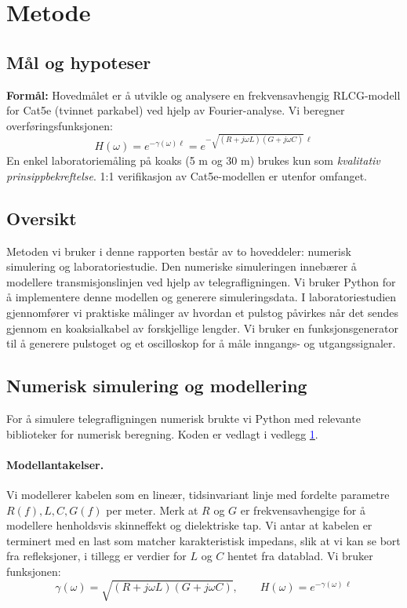 \section{Metode}

\subsection{Mål og hypoteser}
\textbf{Formål:} Hovedmålet er å utvikle og analysere en frekvensavhengig RLCG-modell for Cat5e
(tvinnet parkabel) ved hjelp av Fourier-analyse. Vi beregner overføringsfunksjonen:
\[
H(\omega) = e^{-\gamma(\omega)\ell} = e^{-\sqrt{(R+j\omega L)(G+j\omega C)}\,\ell}
\]
En enkel laboratoriemåling på koaks (5 m og 30 m) brukes kun som \emph{kvalitativ
prinsippbekreftelse}. 1:1 verifikasjon av Cat5e-modellen er utenfor omfanget.

\subsection{Oversikt}
Metoden vi bruker i denne rapporten består av to hoveddeler: numerisk simulering og laboratoriestudie. Den numeriske simuleringen innebærer å modellere transmisjonslinjen ved hjelp av telegrafligningen. Vi bruker Python for å implementere denne modellen og generere simuleringsdata. I laboratoriestudien gjennomfører vi praktiske målinger av hvordan et pulstog påvirkes når det sendes gjennom en koaksialkabel av forskjellige lengder. Vi bruker en funksjonsgenerator til å generere pulstoget og et oscilloskop for å måle inngangs- og utgangssignaler.

\subsection{Numerisk simulering og modellering}
For å simulere telegrafligningen numerisk brukte vi Python med relevante biblioteker for numerisk beregning. Koden er vedlagt i vedlegg \hyperlink{vedlegg}{\textcolor{blue}{1}}.

\paragraph{Modellantakelser.}
Vi modellerer kabelen som en lineær, tidsinvariant linje med fordelte parametre $R(f),L,C,G(f)$ per meter. Merk at $R$ og $G$ er frekvensavhengige for å modellere henholdsvis skinneffekt og dielektriske tap. Vi antar at kabelen er terminert med en last som matcher karakteristisk impedans, slik at vi kan se bort fra refleksjoner, i tillegg er verdier for $L$ og $C$ hentet fra datablad. Vi bruker funksjonen:
\[
\gamma(\omega)=\sqrt{(R+j\omega L)(G+j\omega C)},\qquad
H(\omega)=e^{-\gamma(\omega)\,\ell}
\]

